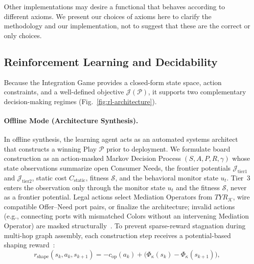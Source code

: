 Other implementations may desire a functional that behaves according to different axioms.  We present our choices of axioms here to clarify the methodology and our implementation, not to suggest that these are the correct or only choices.

\subsection{Reinforcement Learning and Decidability} \label{sec:meth-rl}

Because the Integration Game provides a closed-form state space, action constraints, and a well-defined objective $\mathcal{J}(\mathcal{P})$, it supports two complementary decision-making regimes (Fig.~\ref{fig:rl-architecture}).

\paragraph{Offline Mode (Architecture Synthesis).}
In offline synthesis, the learning agent acts as an automated systems architect that constructs a winning Play $\mathcal{P}$ prior to deployment.  We formulate board construction as an action-masked Markov Decision Process $(S, A, P, R, \gamma)$ whose state observations summarize open Consumer Needs, the frontier potentials $\mathcal{J}_{\text{tier1}}$ and $\mathcal{J}_{\text{tier2}}$, static cost $C_{\text{static}}$, fitness $\mathcal{S}$, and the behavioral monitor state $u_t$.  Tier~3 enters the observation only through the monitor state $u_t$ and the fitness $\mathcal{S}$, never as a frontier potential.  Legal actions select Mediation Operators from $TYR_{\mathcal{K}}$, wire compatible Offer--Need port pairs, or finalize the architecture; invalid actions (e.g., connecting ports with mismatched Colors without an intervening Mediation Operator) are masked structurally~\cite{Huang2022Masking}.  To prevent sparse-reward stagnation during multi-hop graph assembly, each construction step receives a potential-based shaping reward~\cite{NgHaradaRussell1999}:
\begin{equation}
    r_{\text{shape}}(s_k, a_k, s_{k+1}) = -c_{\text{op}}(a_k) + \big(\Phi_{\kappa}(s_k) - \Phi_{\kappa}(s_{k+1})\big),
    \label{eq:pbrs}
\end{equation}
